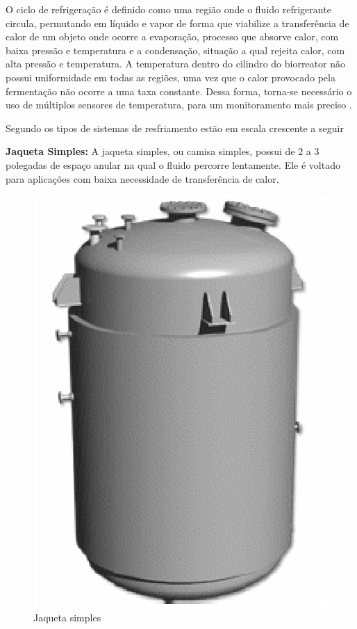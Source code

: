 O ciclo de refrigeração é definido como uma região onde o fluido refrigerante circula, permutando em líquido e vapor de forma que viabilize a transferência de calor de um objeto onde ocorre a evaporação, processo que absorve calor, com baixa pressão e temperatura e a condensação, situação a qual rejeita calor, com alta pressão e temperatura. A temperatura dentro do cilindro do biorreator não possui uniformidade em todas as regiões, uma vez que o calor provocado pela fermentação não ocorre a uma taxa constante. Dessa forma, torna-se necessário o uso de múltiplos sensores de temperatura, para um monitoramento mais preciso \cite{silveira2009analise}.

Segundo \cite{mcketta1991heat} os tipos de sistemas de resfriamento estão em escala crescente a seguir

\textbf{Jaqueta Simples:} A jaqueta simples, ou camisa simples, possui de 2 a 3 polegadas de espaço anular na qual o fluido percorre lentamente. Ele é voltado para aplicações com baixa necessidade de transferência de calor.

\begin{figure}[h]
	\centering
	\includegraphics[keepaspectratio=true,scale=0.4]{figuras/jaqueta.eps}
	\caption{Jaqueta simples \cite{silveira2009analise} }
	\label{jaqueta}
\end{figure}

